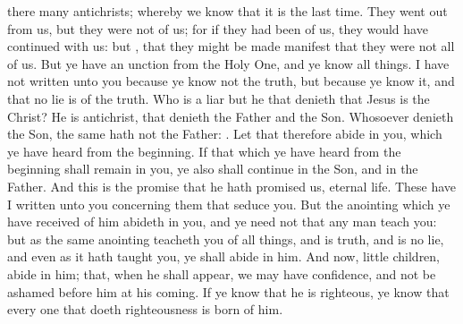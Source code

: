 {there
many
antichrists;
whereby we
know
that it
is
the
last
time.
They
went out
from
us,
but they
were
not
of
us;
for
if they had
been
of
us, they
would
{} have
continued
with
us:
but
{},
that they might be made
manifest
that they
were
not
all
of
us.
But
ye
have an
unction
from the Holy
One,
and ye
know all
things.
I
have
not
written unto
you
because ye
know
not the
truth,
but
because ye
know
it,
and
that
no
lie
is
of the
truth.
Who
is a
liar
but he that
denieth
that
Jesus
is the
Christ? He
is
antichrist,
that
denieth the
Father
and the
Son.
Whosoever
denieth the
Son, the same
hath
not the
Father:
{}.
Let
that
therefore
abide
in
you,
which ye have
heard
from the
beginning.
If that
which ye have
heard
from the
beginning shall
remain
in
you,
ye
also shall
continue
in the
Son,
and
in the
Father.
And
this
is the
promise
that
he hath
promised
us,
{}
eternal
life.
These
{} have I
written unto
you
concerning them that
seduce
you.
But the
anointing
which
ye have
received
of
him
abideth
in
you,
and ye
need
not
that any
man
teach
you:
but
as the
same
anointing
teacheth
you
of all
things,
and
is
truth,
and
is
no
lie,
and even
as it hath
taught
you, ye shall
abide
in
him.
And
now, little
children,
abide
in
him;
that,
when he shall
appear, we may
have
confidence,
and
not be
ashamed
before
him
at
his
coming.
If ye
know
that he
is
righteous, ye
know
that every
one
that
doeth
righteousness is
born
of
him.

}
